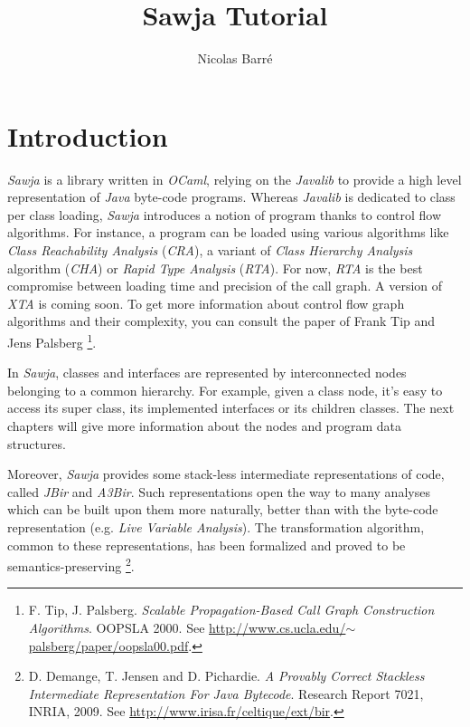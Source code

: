 \documentclass{article}
\title{Sawja Tutorial}
\author{Nicolas Barré}
\begin{document}
\maketitle
\newpage

\tableofcontents
\newpage
\section{Introduction}

\emph{Sawja} is a library written in \emph{OCaml}, relying on the
\emph{Javalib} to provide a high level representation of
\emph{Java} byte-code programs. Whereas \emph{Javalib} is dedicated
to class per class loading, \emph{Sawja} introduces a notion of
program thanks to control flow algorithms. For instance, a program
can be loaded using various algorithms like
\emph{Class Reachability Analysis} (\emph{CRA}), a variant of
\emph{Class Hierarchy Analysis} algorithm (\emph{CHA}) or
\emph{Rapid Type Analysis} (\emph{RTA}). For now, \emph{RTA} is the
best compromise between loading time and precision of the call
graph. A version of \emph{XTA} is coming soon. To get more
information about control flow graph algorithms and their
complexity, you can consult the paper of Frank Tip and Jens
Palsberg%
\footnote{F. Tip, J. Palsberg.
\emph{Scalable Propagation-Based Call Graph Construction Algorithms}.
OOPSLA 2000. See
\href{http://www.cs.ucla.edu/~palsberg/paper/oopsla00.pdf}{http://www.cs.ucla.edu/\ensuremath{\sim}palsberg/paper/oopsla00.pdf}.}.

In \emph{Sawja}, classes and interfaces are represented by
interconnected nodes belonging to a common hierarchy. For example,
given a class node, it's easy to access its super class, its
implemented interfaces or its children classes. The next chapters
will give more information about the nodes and program data
structures.

Moreover, \emph{Sawja} provides some stack-less intermediate
representations of code, called \emph{JBir} and \emph{A3Bir}. Such
representations open the way to many analyses which can be built
upon them more naturally, better than with the byte-code
representation (e.g. \emph{Live Variable Analysis}). The
transformation algorithm, common to these representations, has been
formalized and proved to be semantics-preserving%
\footnote{D. Demange, T. Jensen and D. Pichardie.
\emph{A Provably Correct Stackless Intermediate Representation For Java Bytecode}.
Research Report 7021, INRIA, 2009. See
\href{http://irisa.fr/celtique/ext/bir}{http://www.irisa.fr/celtique/ext/bir}.}.
\end{document}
